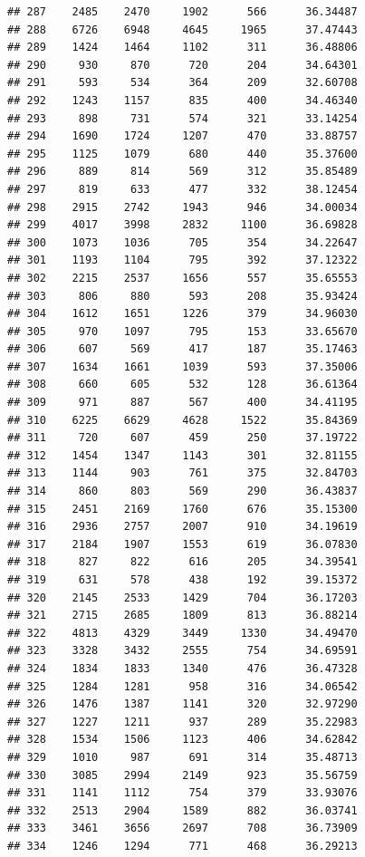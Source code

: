 \documentclass[
]{article}
\begin{document}
\begin{verbatim}
## 287    2485    2470     1902      566      36.34487
## 288    6726    6948     4645     1965      37.47443
## 289    1424    1464     1102      311      36.48806
## 290     930     870      720      204      34.64301
## 291     593     534      364      209      32.60708
## 292    1243    1157      835      400      34.46340
## 293     898     731      574      321      33.14254
## 294    1690    1724     1207      470      33.88757
## 295    1125    1079      680      440      35.37600
## 296     889     814      569      312      35.85489
## 297     819     633      477      332      38.12454
## 298    2915    2742     1943      946      34.00034
## 299    4017    3998     2832     1100      36.69828
## 300    1073    1036      705      354      34.22647
## 301    1193    1104      795      392      37.12322
## 302    2215    2537     1656      557      35.65553
## 303     806     880      593      208      35.93424
## 304    1612    1651     1226      379      34.96030
## 305     970    1097      795      153      33.65670
## 306     607     569      417      187      35.17463
## 307    1634    1661     1039      593      37.35006
## 308     660     605      532      128      36.61364
## 309     971     887      567      400      34.41195
## 310    6225    6629     4628     1522      35.84369
## 311     720     607      459      250      37.19722
## 312    1454    1347     1143      301      32.81155
## 313    1144     903      761      375      32.84703
## 314     860     803      569      290      36.43837
## 315    2451    2169     1760      676      35.15300
## 316    2936    2757     2007      910      34.19619
## 317    2184    1907     1553      619      36.07830
## 318     827     822      616      205      34.39541
## 319     631     578      438      192      39.15372
## 320    2145    2533     1429      704      36.17203
## 321    2715    2685     1809      813      36.88214
## 322    4813    4329     3449     1330      34.49470
## 323    3328    3432     2555      754      34.69591
## 324    1834    1833     1340      476      36.47328
## 325    1284    1281      958      316      34.06542
## 326    1476    1387     1141      320      32.97290
## 327    1227    1211      937      289      35.22983
## 328    1534    1506     1123      406      34.62842
## 329    1010     987      691      314      35.48713
## 330    3085    2994     2149      923      35.56759
## 331    1141    1112      754      379      33.93076
## 332    2513    2904     1589      882      36.03741
## 333    3461    3656     2697      708      36.73909
## 334    1246    1294      771      468      36.29213

\end{verbatim}
\end{document}
